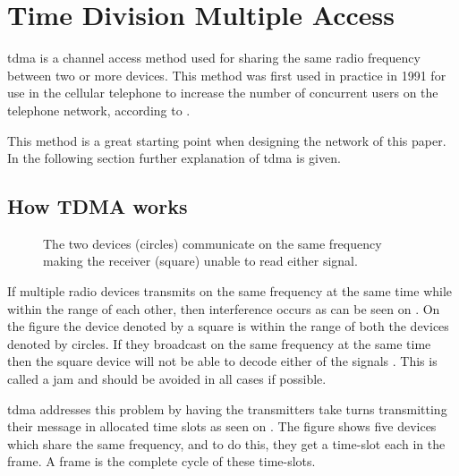 \chapter{Time Division Multiple Access}\label{TDMA}

\gls{tdma} is a channel access method used for sharing the same radio frequency between two or more devices.
This method was first used in practice in 1991 for use in the cellular telephone to increase the number of concurrent users on the telephone network, according to \citet{networkencyclopedia2013time}.

This method is a great starting point when designing the network of this paper.
In the following section further explanation of \gls{tdma} is given.

\section{How TDMA works}

\begin{SCfigure}
    \vspace{-10pt}
    \centering
    \footnotesize
    \resizebox{0.5\linewidth}{!}{%
}
    \caption{The two devices (circles) communicate on the same frequency making the receiver (square) unable to read either signal.}
    \label{fig:rangediagram}
    \vspace{-10pt}    
\end{SCfigure}

If multiple radio devices transmits on the same frequency at the same time while within the range of each other, then interference occurs as can be seen on . 
On the figure the device denoted by a square is within the range of both the devices denoted by circles. 
If they broadcast on the same frequency at the same time then the square device will not be able to decode either of the signals \cite{networkencyclopedia2013time, networkencyclopedia2013advanced}.
This is called a jam and should be avoided in all cases if possible.

\gls{tdma} addresses this problem by having the transmitters take turns transmitting their message in allocated time slots as seen on .
The figure shows five devices which share the same frequency, and to do this, they get a time-slot each in the frame.
A frame is the complete cycle of these time-slots.


